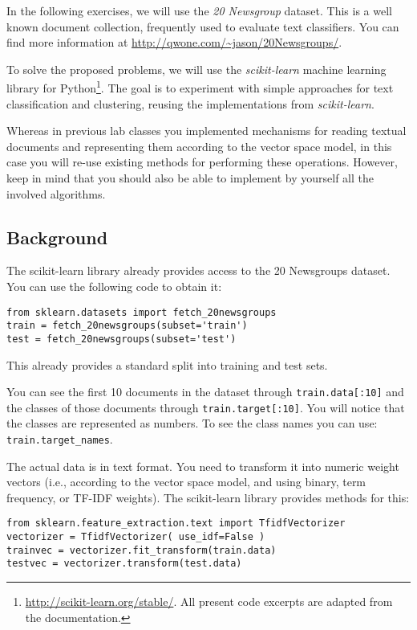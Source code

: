 \documentclass[12pt]{article}
\begin{document}

In the following exercises, we will use the \emph{20 Newsgroup} dataset. This is a well known document collection, frequently used to evaluate text classifiers. You can find more
information at \url{http://qwone.com/~jason/20Newsgroups/}.

To solve the proposed problems, we will use the \emph{scikit-learn} machine learning library for Python\footnote{\url{http://scikit-learn.org/stable/}. All present code excerpts are adapted from the documentation.}. The goal is to experiment with simple approaches for text classification and clustering, reusing the implementations from \emph{scikit-learn}.

Whereas in previous lab classes you implemented mechanisms for reading textual documents and representing them according to the vector space model, in this case you will re-use existing methods for performing these operations. However, keep in mind that you should also be able to implement by yourself all the involved algorithms.

\subsection*{Background}

The scikit-learn library already provides access to the 20 Newsgroups dataset. You can use the following code to obtain it:

\begin{verbatim}
from sklearn.datasets import fetch_20newsgroups
train = fetch_20newsgroups(subset='train')
test = fetch_20newsgroups(subset='test')
\end{verbatim}

This already provides a standard split into training and test sets.

You can see the first 10 documents in the dataset through
\verb+train.data[:10]+ and the classes of those documents through \verb+train.target[:10]+. You will notice that the classes are represented as numbers. To see the class names you can use: \verb+train.target_names+.

The actual data is in text format. You need to transform it into numeric weight vectors (i.e., according to the vector space model, and using binary, term frequency, or TF-IDF weights). The scikit-learn library provides methods for this:
\begin{verbatim}
from sklearn.feature_extraction.text import TfidfVectorizer
vectorizer = TfidfVectorizer( use_idf=False )
trainvec = vectorizer.fit_transform(train.data)
testvec = vectorizer.transform(test.data)
\end{verbatim}
\end{document}
